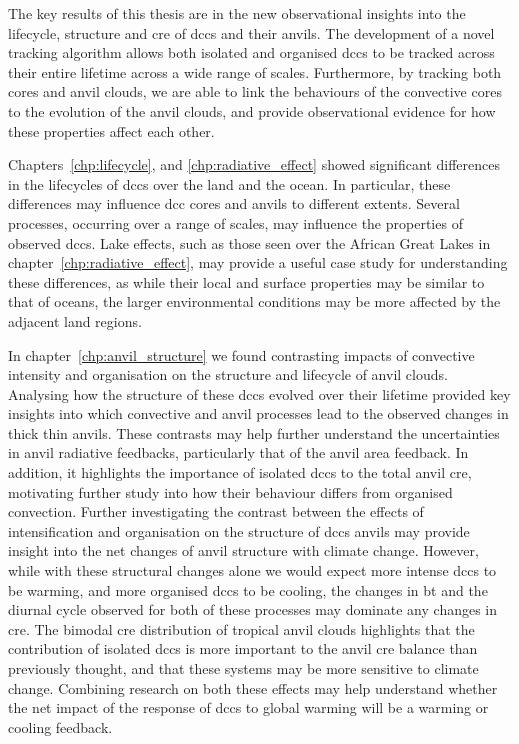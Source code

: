 The key results of this thesis are in the new observational insights into the lifecycle, structure and \acrshort{cre} of \acrshort{dcc}s and their anvils.
The development of a novel tracking algorithm allows both isolated and organised \acrshort{dcc}s to be tracked across their entire lifetime across a wide range of scales.
Furthermore, by tracking both cores and anvil clouds, we are able to link the behaviours of the convective cores to the evolution of the anvil clouds, and provide observational evidence for how these properties affect each other.

Chapters~\ref{chp:lifecycle}, and \ref{chp:radiative_effect} showed significant differences in the lifecycles of \acrshort{dcc}s over the land and the ocean.
In particular, these differences may influence \acrshort{dcc} cores and anvils to different extents.
Several processes, occurring over a range of scales, may influence the properties of observed \acrshort{dcc}s.
Lake effects, such as those seen over the African Great Lakes in chapter~\ref{chp:radiative_effect}, may provide a useful case study for understanding these differences, as while their local and surface properties may be similar to that of oceans, the larger environmental conditions may be more affected by the adjacent land regions.

In chapter~\ref{chp:anvil_structure} we found contrasting impacts of convective intensity and organisation on the structure and lifecycle of anvil clouds. 
Analysing how the structure of these \acrshort{dcc}s evolved over their lifetime provided key insights into which convective and anvil processes lead to the observed changes in thick thin anvils.
These contrasts may help further understand the uncertainties in anvil radiative feedbacks, particularly that of the anvil area feedback.
In addition, it highlights the importance of isolated \acrshort{dcc}s to the total anvil \acrshort{cre}, motivating further study into how their behaviour differs from organised convection.
Further investigating the contrast between the effects of intensification and organisation on the structure of \acrshort{dcc}s anvils may provide insight into the net changes of anvil structure with climate change. However, while with these structural changes alone we would expect more intense \acrshort{dcc}s to be warming, and more organised \acrshort{dcc}s to be cooling, the changes in \acrshort{bt} and the diurnal cycle observed for both of these processes may dominate any changes in \acrshort{cre}.
The bimodal \acrshort{cre} distribution of tropical anvil clouds highlights that the contribution of isolated \acrshort{dcc}s is more important to the anvil \acrshort{cre} balance than previously thought, and that these systems may be more sensitive to climate change. Combining research on both these effects may help understand whether the net impact of the response of \acrshort{dcc}s to global warming will be a warming or cooling feedback.

